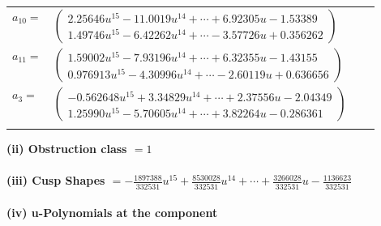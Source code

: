 \documentclass[1p]{elsarticle_modified}
\theoremstyle{definition}
\begin{document}
\begin{tabular}{m{7pt} m{180pt} m{7pt} m{180pt} }
\flushright $a_{10}=$&$\begin{pmatrix}2.25646 u^{15}-11.0019 u^{14}+\cdots+6.92305 u-1.53389\\1.49746 u^{15}-6.42262 u^{14}+\cdots-3.57726 u+0.356262\end{pmatrix}$ \\
\flushright $a_{11}=$&$\begin{pmatrix}1.59002 u^{15}-7.93196 u^{14}+\cdots+6.32355 u-1.43155\\0.976913 u^{15}-4.30996 u^{14}+\cdots-2.60119 u+0.636656\end{pmatrix}$ \\
\flushright $a_{3}=$&$\begin{pmatrix}-0.562648 u^{15}+3.34829 u^{14}+\cdots+2.37556 u-2.04349\\1.25990 u^{15}-5.70605 u^{14}+\cdots+3.82264 u-0.286361\end{pmatrix}$\\&\end{tabular}
\flushleft \textbf{(ii) Obstruction class $= 1$}\\~\\
\flushleft \textbf{(iii) Cusp Shapes $= -\frac{1897388}{332531} u^{15}+\frac{8530028}{332531} u^{14}+\cdots+\frac{3266028}{332531} u-\frac{1136623}{332531}$}\\~\\
\newpage\renewcommand{\arraystretch}{1}
\flushleft \textbf{(iv) u-Polynomials at the component}\newline \\
\end{document}
